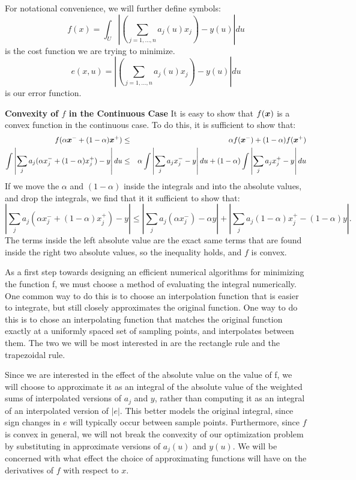For notational convenience, we will further define symbols:
\begin{equation}
 f(x) = \int_U{ \left|\left(\sum_{j=1,\ldots,n} a_j(u) x_j\right) - y(u)\right| du}
\end{equation}
is the cost function we are trying to minimize.
\begin{equation}
 e(x,u) = \left|\left(\sum_{j=1,\ldots,n} a_j(u) x_j\right) - y(u)\right| du
\end{equation}
is our error function.

{\bf Convexity of $f$ in the Continuous Case } 
%
It is easy to show that $f({\boldsymbol{x}})$
is a convex function in the continuous case.  To do this, it is sufficient to
show that:
%
\begin{eqnarray*}
f(\alpha {\boldsymbol{x}}^- + (1-\alpha) {\boldsymbol{x}}^+) 
	&\leq& \alpha f({\boldsymbol{x}}^-) + (1-\alpha) f({\boldsymbol{x}}^+) \\
\int \left|\sum_j a_j (\alpha x_j^- + (1-\alpha) x_j^+) - y\right| du 
	&\leq& \alpha \int \left|\sum_j a_j x_j^- - y\right|du + (1 - \alpha) \int \left|\sum_j a_j x_j^+ - y\right|du
\end{eqnarray*}
%
If we move the $\alpha$ and $(1-\alpha)$ inside the integrals and into the absolute values, 
and drop the integrals, we find that it it sufficient to show that:
%
\begin{equation*}
\left|\sum_j a_j (\alpha x_j^- + (1-\alpha) x_j^+) - y\right|
	\leq \left|\sum_j a_j (\alpha x_j^-) - \alpha y\right| + \left|\sum_j a_j (1 - \alpha) x_j^+ - (1 - \alpha) y\right|.
\end{equation*}
%
The terms inside the left absolute value are the exact same terms 
that are found inside the right two absolute values, so the inequality holds, and $f$ is convex. 

As a first step towards designing an efficient numerical algorithms for
minimizing the function f, we must choose a method of evaluating the integral
numerically.  One common way to do this is to choose an interpolation function
that is easier to integrate, but still closely approximates the original
function.  One way to do this is to chose an interpolating function that
matches the original function exactly at a uniformly spaced set of sampling
points, and interpolates between them.  The two we will be most interested in
are the rectangle rule and the trapezoidal rule.  

Since we are interested in the effect of the absolute value on the value of f,
we will choose to approximate it as an integral of the absolute value of the
weighted sums of interpolated versions of $a_j$ and $y$, rather than computing
it as an integral of an interpolated version of $|e|$.  This better models the
original integral, since sign changes in $e$ will typically occur between
sample points.  Furthermore, since $f$ is convex in general, we will not break
the convexity of our optimization problem by substituting in approximate
versions of $a_j(u)$ and $y(u)$.  We will be concerned with what effect the
choice of approximating functions will have on the derivatives of $f$ with
respect to $x$.

